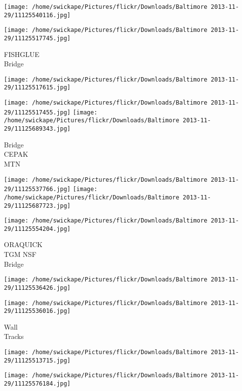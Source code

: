 \documentclass[10pt,letterpaper]{article}
\begin{document}
\texttt{[image: /home/swickape/Pictures/flickr/Downloads/Baltimore 2013-11-29/11125540116.jpg]}

\vspace{0.25in}
\texttt{[image: /home/swickape/Pictures/flickr/Downloads/Baltimore 2013-11-29/11125517745.jpg]}

FISHGLUE\\
Bridge\\
\pagebreak

\texttt{[image: /home/swickape/Pictures/flickr/Downloads/Baltimore 2013-11-29/11125517615.jpg]}

\vspace{0.25in}
\texttt{[image: /home/swickape/Pictures/flickr/Downloads/Baltimore 2013-11-29/11125517455.jpg]}
\texttt{[image: /home/swickape/Pictures/flickr/Downloads/Baltimore 2013-11-29/11125689343.jpg]}

Bridge\\
CEPAK\\
MTN\\
\pagebreak

\texttt{[image: /home/swickape/Pictures/flickr/Downloads/Baltimore 2013-11-29/11125537766.jpg]}
\texttt{[image: /home/swickape/Pictures/flickr/Downloads/Baltimore 2013-11-29/11125687723.jpg]}

\texttt{[image: /home/swickape/Pictures/flickr/Downloads/Baltimore 2013-11-29/11125554204.jpg]}

ORAQUICK\\
TGM NSF\\
Bridge\\
\pagebreak

\texttt{[image: /home/swickape/Pictures/flickr/Downloads/Baltimore 2013-11-29/11125536426.jpg]}

\vspace{0.25in}
\texttt{[image: /home/swickape/Pictures/flickr/Downloads/Baltimore 2013-11-29/11125536016.jpg]}

Wall\\
Tracks\\
\pagebreak

\texttt{[image: /home/swickape/Pictures/flickr/Downloads/Baltimore 2013-11-29/11125513715.jpg]}

\vspace{0.25in}
\texttt{[image: /home/swickape/Pictures/flickr/Downloads/Baltimore 2013-11-29/11125576184.jpg]}
\end{document}

